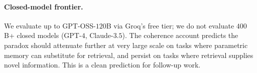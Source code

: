 \paragraph{Closed-model frontier.} We evaluate up to GPT-OSS-$120$B
via Groq's free tier; we do not evaluate $400$B+ closed models
(GPT-$4$, Claude-$3.5$). The coherence account predicts the paradox
should attenuate further at very large scale on tasks where
parametric memory can substitute for retrieval, and persist on tasks
where retrieval supplies novel information. This is a clean
prediction for follow-up work.
